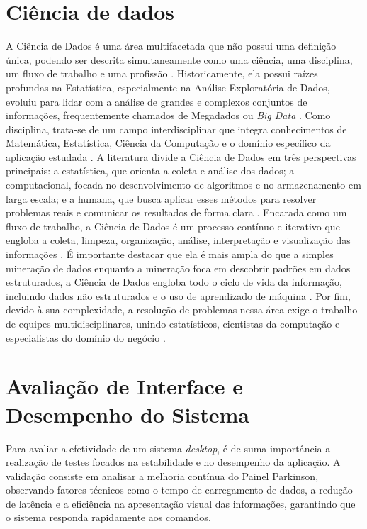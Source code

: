 

\section{Ciência de dados}
\label{sec:Ciencia de dados}

A Ciência de Dados é uma área multifacetada que não possui uma definição única, podendo ser descrita simultaneamente como uma ciência, uma disciplina, um fluxo de trabalho e uma profissão \cite{mendes2025fundamentos}. Historicamente, ela possui raízes profundas na Estatística, especialmente na Análise Exploratória de Dados, evoluiu para lidar com a análise de grandes e complexos conjuntos de informações, frequentemente chamados de Megadados ou \textit{Big Data} \cite{morettin2019introducao}.  Como disciplina, trata-se de um campo interdisciplinar que integra conhecimentos de Matemática, Estatística, Ciência da Computação e o domínio específico da aplicação estudada \cite{mendes2025fundamentos}. A literatura divide a Ciência de Dados em três perspectivas principais: a estatística, que orienta a coleta e análise dos dados; a computacional, focada no desenvolvimento de algoritmos e no armazenamento em larga escala; e a humana, que busca aplicar esses métodos para resolver problemas reais e comunicar os resultados de forma clara \cite{morettin2019introducao}.  Encarada como um fluxo de trabalho, a Ciência de Dados é um processo contínuo e iterativo que engloba a coleta, limpeza, organização, análise, interpretação e visualização das informações \cite{mendes2025fundamentos}. É importante destacar que ela é mais ampla do que a simples mineração de dados enquanto a mineração foca em descobrir padrões em dados estruturados, a Ciência de Dados engloba todo o ciclo de vida da informação, incluindo dados não estruturados e o uso de aprendizado de máquina \cite{mendes2025fundamentos}. Por fim, devido à sua complexidade, a resolução de problemas nessa área exige o trabalho de equipes multidisciplinares, unindo estatísticos, cientistas da computação e especialistas do domínio do negócio \cite{morettin2019introducao}.

\section{Avaliação de Interface e Desempenho do Sistema}
\label{sec:Teste}

Para avaliar a efetividade de um sistema \textit{desktop}, é de suma importância a realização de testes focados na estabilidade e no desempenho da aplicação. A validação consiste em analisar a melhoria contínua do Painel Parkinson, observando fatores técnicos como o tempo de carregamento de dados, a redução de latência e a eficiência na apresentação visual das informações, garantindo que o sistema responda rapidamente aos comandos.

